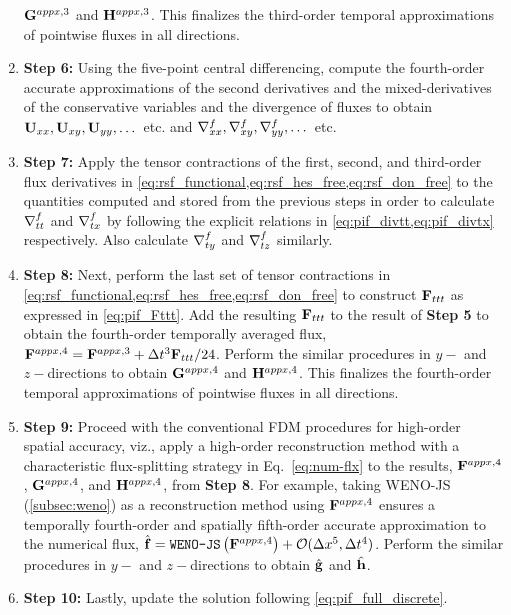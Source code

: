 \begin{enumerate}
        \( \mathbf{G}^{appx,3}\) and \( \mathbf{H}^{appx,3}\).
        This finalizes the third-order temporal approximations of pointwise fluxes in all directions.
    \item[] \textbf{Step 6:}
        Using the five-point central differencing, 
        compute the fourth-order accurate approximations 
        of the second derivatives and the mixed-derivatives
        of the conservative variables and the divergence of fluxes
        to obtain
        \( \mathbf{U}_{xx}, \mathbf{U}_{xy}, \mathbf{U}_{yy}, \dots \) etc. and \( \nabla^{f}_{xx}, \nabla^{f}_{xy}, \nabla^{f}_{yy}, \dots \) etc.
    \item[] \textbf{Step 7:}
        Apply the tensor contractions of the first, second, and
        third-order flux derivatives in \cref{eq:rsf_functional,eq:rsf_hes_free,eq:rsf_don_free}
        to the quantities computed and stored from the previous steps in order to 
        calculate \( \nabla^{f}_{tt} \) and \( \nabla^{f}_{tx} \)
        by following the explicit relations in \cref{eq:pif_divtt,eq:pif_divtx} respectively.
        Also calculate \( \nabla^{f}_{ty} \) and \( \nabla^{f}_{tz} \) similarly.
    \item[] \textbf{Step 8:}
        Next, perform the last set of tensor contractions
        in \cref{eq:rsf_functional,eq:rsf_hes_free,eq:rsf_don_free}
        to construct \( \mathbf{F}_{ttt} \) as expressed in \cref{eq:pif_Fttt}.
        Add the resulting \( \mathbf{F}_{ttt} \) to the result of \textbf{Step 5} to obtain the fourth-order
        temporally averaged flux,
        \( \mathbf{F}^{appx,4} = \mathbf{F}^{appx,3} + \Delta t^{3} \mathbf{F}_{ttt}/24 \).
        Perform the similar procedures in \( y- \) and \( z- \)directions to obtain
        \( \mathbf{G}^{appx,4}\) and \( \mathbf{H}^{appx,4}\).
        This finalizes the fourth-order temporal approximations of pointwise fluxes in all directions.
    \item[] \textbf{Step 9:}
        Proceed with the conventional FDM procedures for high-order spatial accuracy, viz.,
        apply a high-order reconstruction method with a characteristic flux-splitting strategy
        in Eq.~\eqref{eq:num-flx}
        to the results, \( \mathbf{F}^{appx,4}\), \( \mathbf{G}^{appx,4}\), and \( \mathbf{H}^{appx,4}\),
        from \textbf{Step 8}. For example, taking WENO-JS (\cref{subsec:weno}) as a reconstruction method using
        \( \mathbf{F}^{appx, 4} \) ensures a temporally fourth-order 
        and spatially fifth-order accurate approximation to the numerical flux,
        \( \hat{\mathbf{f}} = \texttt{WENO-JS} \left ( \mathbf{F}^{appx,4} \right) + \mathcal{O}(\Delta x^{5},\Delta t^{4}) \).
        Perform the similar procedures in \( y- \) and \( z- \)directions to obtain
        \( \hat{\mathbf{g}}\) and \( \hat{\mathbf{h}}\).
    \item[] \textbf{Step 10:}
        Lastly, update the solution following \cref{eq:pif_full_discrete}.
\end{enumerate}





